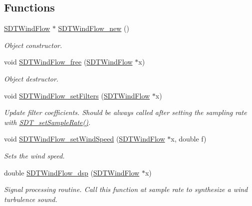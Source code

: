 \subsection*{Functions}
\begin{DoxyCompactItemize}
\item 
\hyperlink{group__windflow_ga7eba31614e4346c35a480ca5da3945fe}{S\+D\+T\+Wind\+Flow} $\ast$ \hyperlink{group__windflow_gabfb3c93b2f5663b5772a9c33e131e5ae}{S\+D\+T\+Wind\+Flow\+\_\+new} ()
\begin{DoxyCompactList}\small\item\em Object constructor. \end{DoxyCompactList}\item 
void \hyperlink{group__windflow_ga96b1c440d6fc00788ca1190babcea973}{S\+D\+T\+Wind\+Flow\+\_\+free} (\hyperlink{group__windflow_ga7eba31614e4346c35a480ca5da3945fe}{S\+D\+T\+Wind\+Flow} $\ast$x)
\begin{DoxyCompactList}\small\item\em Object destructor. \end{DoxyCompactList}\item 
void \hyperlink{group__windflow_ga6f7ed2fe43b58cdfb9b4a186560d1060}{S\+D\+T\+Wind\+Flow\+\_\+set\+Filters} (\hyperlink{group__windflow_ga7eba31614e4346c35a480ca5da3945fe}{S\+D\+T\+Wind\+Flow} $\ast$x)
\begin{DoxyCompactList}\small\item\em Update filter coefficients. Should be always called after setting the sampling rate with \hyperlink{group__common_gad76f7b9f128e79164c76764be6e03be8}{S\+D\+T\+\_\+set\+Sample\+Rate()}. \end{DoxyCompactList}\item 
void \hyperlink{group__windflow_gaf1e2f8adc5294b5da5b76a40e044a842}{S\+D\+T\+Wind\+Flow\+\_\+set\+Wind\+Speed} (\hyperlink{group__windflow_ga7eba31614e4346c35a480ca5da3945fe}{S\+D\+T\+Wind\+Flow} $\ast$x, double f)
\begin{DoxyCompactList}\small\item\em Sets the wind speed. \end{DoxyCompactList}\item 
double \hyperlink{group__windflow_ga0ea8e48562a527e97a12799254a07358}{S\+D\+T\+Wind\+Flow\+\_\+dsp} (\hyperlink{group__windflow_ga7eba31614e4346c35a480ca5da3945fe}{S\+D\+T\+Wind\+Flow} $\ast$x)
\begin{DoxyCompactList}\small\item\em Signal processing routine. Call this function at sample rate to synthesize a wind turbulence sound. \end{DoxyCompactList}\end{DoxyCompactItemize}


